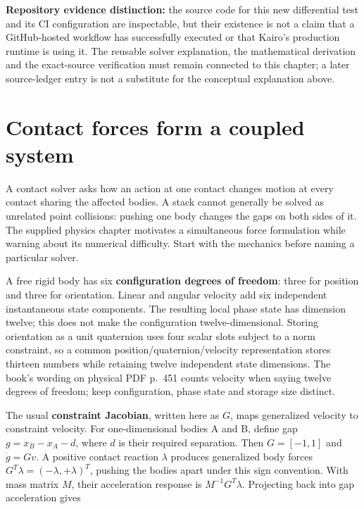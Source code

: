 \textbf{Repository evidence distinction:} the source code for this new differential test and its CI configuration are inspectable, but their existence is not a claim that a GitHub-hosted workflow has successfully executed or that Kairo's production runtime is using it. The reusable solver explanation, the mathematical derivation and the exact-source verification must remain connected to this chapter; a later source-ledger entry is not a substitute for the conceptual explanation above.

\section{Contact forces form a coupled system}\label{06-engine-ii-ch046-contact-forces-form-a-coupled-system}

\hypertarget{06-engine-ii-ch046-contact-forces-form-a-coupled-system}{}

A contact solver asks how an action at one contact changes motion at every contact sharing the affected bodies. A stack cannot generally be solved as unrelated point collisions: pushing one body changes the gaps on both sides of it. The supplied physics chapter motivates a simultaneous force formulation while warning about its numerical difficulty. Start with the mechanics before naming a particular solver.

A free rigid body has six \textbf{configuration degrees of freedom}: three for position and three for orientation. Linear and angular velocity add six independent instantaneous state components. The resulting local phase state has dimension twelve; this does not make the configuration twelve-dimensional. Storing orientation as a unit quaternion uses four scalar slots subject to a norm constraint, so a common position/quaternion/velocity representation stores thirteen numbers while retaining twelve independent state dimensions. The book's wording on physical PDF p.~451 counts velocity when saying twelve degrees of freedom; keep configuration, phase state and storage size distinct.

The usual \textbf{constraint Jacobian}, written here as \(G\), maps generalized velocity to constraint velocity. For one-dimensional bodies A and B, define gap \(g=x_B-x_A-d\), where \(d\) is their required separation. Then \(G=[-1,1]\) and \(\dot g=Gv\). A positive contact reaction \(\lambda\) produces generalized body forces \(G^T\lambda=(-\lambda,+\lambda)^T\), pushing the bodies apart under this sign convention. With mass matrix \(M\), their acceleration response is \(M^{-1}G^T\lambda\). Projecting back into gap acceleration gives

